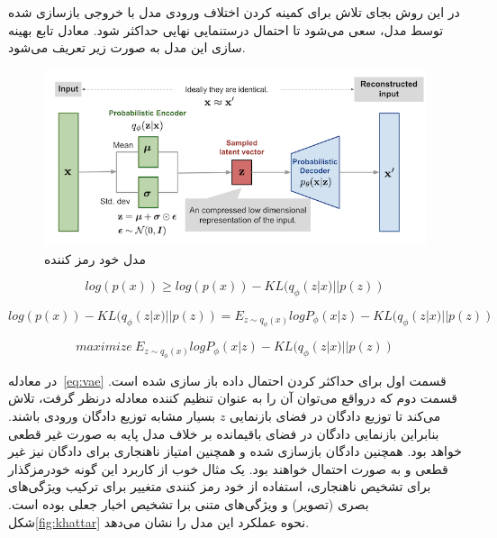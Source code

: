 \documentclass[12pt,a4paper]{report}
\theoremstyle{definition}
\theoremstyle{definition}
\begin{document}
در این روش بجای تلاش برای کمینه کردن اختلاف ورودی مدل با خروجی بازسازی شده توسط مدل، سعی می‌شود تا احتمال درستنمایی نهایی حداکثر شود. معادل تابع بهینه سازی این مدل به صورت زیر تعریف می‌شود.
\begin{figure}[!h]
	\begin{center}
		\includegraphics[width=0.7\linewidth]{./images/figures/vae.png}
	\end{center}
	\caption{مدل خود رمز کننده }
	\label{fig:vae}
	\centering
\end{figure}

\begin{equation}
log(p(x)) \ge log(p(x)) - KL(q_\phi(z|x) || p(z))
\end{equation}

\begin{equation}
log(p(x)) - KL(q_\phi(z|x) || p(z)) = E_{z \sim q_\phi(x)}logP_\phi(x|z)  -  KL(q_\phi(z|x) || p(z))
\end{equation}


\begin{equation}
maximize\  E_{z \sim q_\phi(x)}logP_\phi(x|z)  -  KL(q_\phi(z|x) || p(z))
\label{eq:vae}
\end{equation}

در معادله~\eqref{eq:vae} قسمت اول برای حداکثر کردن احتمال داده باز سازی شده است. قسمت دوم که درواقع می‌توان آن را به عنوان تنظیم کننده معادله درنظر گرفت، تلاش می‌کند تا توزیع دادگان در فضای بازنمایی $z$ بسیار مشابه توزیع دادگان ورودی باشند. بنابراین بازنمایی دادگان در فضای باقیمانده بر خلاف مدل پایه به صورت غیر قطعی خواهد بود. همچنین دادگان بازسازی شده و همچنین امتیاز ناهنجاری برای دادگان نیز غیر قطعی و به صورت احتمال خواهند بود. یک مثال خوب از کاربرد این گونه خودرمزگذار برای تشخیص ناهنجاری، استفاده از خود رمز کنندی متغییر برای ترکیب ویژگی‌های بصری (تصویر) و ویژگی‌های متنی برا تشخیص اخبار جعلی بوده است\cite{10.1145/3308558.3313552}. شکل\ref{fig:khattar} نحوه عملکرد این مدل را نشان می‌دهد.
\end{document}
